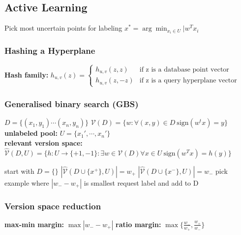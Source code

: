 \documentclass[10pt,parskip]{scrartcl}
\begin{document}
\begin{multicols*}{3}
\subsection{Active Learning} %
\label{sub:active_learning}
Pick most uncertain points for labeling 
$x^{\ast} = \arg\min_{x_i\in U}|w^Tx_i$ \\
\subsubsection{Hashing a Hyperplane} %
\label{ssub:hashing_a_hyperplane}
\textbf{Hash family: } $h_{u,v}(z) = \begin{cases}
	h_{u,v}(z,z) & \text{if z is a database point vector} \\
	h_{u,v}(z,-z) & \text{if z is a query hyperplane vector}
\end{cases}$ \\
\subsubsection{Generalised binary search (GBS)} %
\label{ssub:gbs}
$D = \{(x_1,y_1) \cdots (x_n,y_n) \}$ \qquad 
$\mathcal{V}(D) = \{w: \forall(x,y) \in D \ \mathrm{sign}(w^tx) = y \}$ \\
\textbf{unlabeled pool: } $U = \{x_1',\cdots,x_n'\}$ \\
\textbf{relevant version space: } $\hat{\mathcal{V}}(D,U) = \{h:U \to \{+1,-1\} : \exists w \in \mathcal{V}(D) \forall x\in U \ \mathrm{sign}(w^Tx) = h(y) \}$
\begin{mdframed}
	\begin{algorithmic}
		\State start with $D=\{\}$
				\State $|\hat{\mathcal{V}}(D\cup \{x^+\},U)| = w_+$
				\State $|\hat{\mathcal{V}}(D\cup \{x^-\},U)| = w_-$
			\EndFor
			\State pick example where $|w_- - w_+|$ is smallest
			\State request label and add to D
		\EndWhile
	\end{algorithmic}
\end{mdframed}
\subsubsection{Version space reduction} %
\label{ssub:version_space_reduction}
\textbf{max-min margin: } $\max |w_- - w_+|$ \quad \textbf{ratio margin: } $\max \{\frac{w_-}{w_+},\frac{w_+}{w_-} \}$

\end{multicols*}
\end{document}
